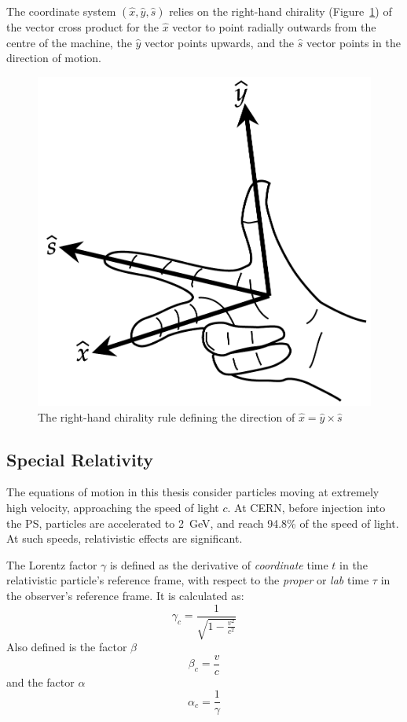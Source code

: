 \documentclass[a4paper,twoside,11pt]{report}
\begin{document}
The coordinate system $(\hat x, \hat y, \hat s)$ relies on the right-hand chirality (Figure~\ref{fig:rhr}) of the vector cross product for the $\hat x$ vector to point radially outwards from the centre of the machine, the $\hat y$ vector points upwards, and the $\hat s$ vector points in the direction of motion.

\begin{figure}[!h]
  \centering
  \includegraphics[scale=.25]{rhr.pdf}
  \caption[The right-hand rule]{The right-hand chirality rule defining the direction of $\hat x = \hat y \times \hat s$}\label{fig:rhr}
\end{figure}

\subsection{Special Relativity}

The equations of motion in this thesis consider particles moving at extremely high velocity, approaching the speed of light $c$. At CERN, before injection into the PS, particles are accelerated to \qty{2}{\giga\electronvolt}, and reach 94.8\% of the speed of light. At such speeds, relativistic effects are significant.

The Lorentz factor $\gamma$ is defined as the derivative of \textit{coordinate} time $t$ in the relativistic particle's reference frame, with respect to the \textit{proper} or \textit{lab} time $\tau$ in the observer's reference frame. It is calculated as:
\begin{equation}
    \gamma_c = \frac 1{\sqrt{1-\frac{v^2}{c^2}}}
\end{equation}
Also defined is the factor $\beta$
\begin{equation}
    \beta_c = \frac vc
\end{equation}
and the factor $\alpha$
\begin{equation}
    \alpha_c = \frac 1\gamma
\end{equation}
\end{document}

